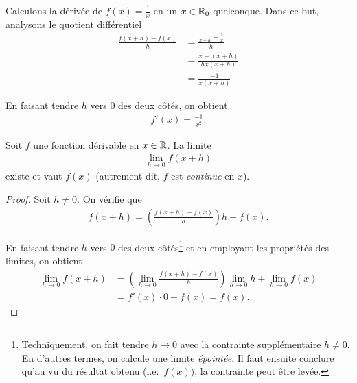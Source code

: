 \documentclass[main.tex]{subfiles}
\begin{document}
\begin{example}

    Calculons la dérivée de $f(x) = \frac 1 x$ en un $x \in \mathbb{R}_0$ quelconque.
    Dans ce but,
    analysons le quotient différentiel
    \begin{align}
        \frac {f(x + h) - f(x)} h
        &= \frac {\frac 1 {x + h} - \frac 1 x} h\\
        &= \frac {x - (x + h)} {h x (x + h)}\\
        &= \frac {-1} {x (x + h)}
    \end{align}

    En faisant tendre $h$ vers $0$ des deux côtés,
    on obtient
    \begin{align}
        f'(x) = \frac {-1} {x^2}.
    \end{align}
\end{example}

\begin{proposition}

    Soit $f$ une fonction dérivable en $x \in \mathbb{R}$.
    La limite
    \begin{align}
        \lim_{h \to 0} f(x + h)
    \end{align}
    existe et vaut $f(x)$
    (autrement dit, $f$ est \emph{continue} en $x$).
\end{proposition}
\begin{proof}
    Soit $h \neq 0$.
    On vérifie que
    \begin{align}
        f(x + h) = \left(\frac {f(x + h) - f(x)} h\right) h + f(x).
    \end{align}

    En faisant tendre $h$ vers $0$ des deux côtés\footnote{%
        Techniquement, on fait tendre $h \to 0$ avec la contrainte supplémentaire $h \neq 0$.
        En d'autres termes, on calcule une limite \emph{épointée}.
        Il faut ensuite conclure qu'au vu du résultat obtenu (i.e.\ $f(x)$),
        la contrainte peut être levée.
    }
    et en employant les propriétés des limites,
    on obtient
    \begin{align}
        \lim_{h \to 0} f(x + h)
        &= \left(\lim_{h \to 0} \frac {f(x + h) - f(x)} h\right) \lim_{h \to 0} h + \lim_{h \to 0} f(x)\\
        &= f'(x) \cdot 0 + f(x) = f(x).
    \end{align}
\end{proof}
\end{document}
